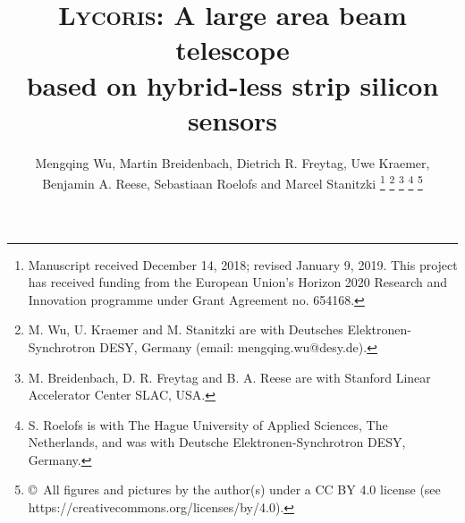 \documentclass[journal]{IEEEtran}
\begin{document}

\title{\textsc{Lycoris}: A large area beam telescope\\ based on hybrid-less strip silicon sensors}

%
%
%


\author{Mengqing Wu, Martin Breidenbach, Dietrich R. Freytag, Uwe Kraemer,\\Benjamin A. Reese, Sebastiaan Roelofs and Marcel Stanitzki%
\thanks{Manuscript received December 14, 2018; revised January 9, 2019. This project has received funding from the European Union's Horizon 2020 Research and Innovation programme under Grant Agreement no. 654168.}
\thanks{M. Wu, U. Kraemer and M. Stanitzki are with Deutsches Elektronen-Synchrotron DESY, Germany (email: mengqing.wu@desy.de).}%
\thanks{M. Breidenbach, D. R. Freytag and B. A. Reese are with Stanford Linear Accelerator Center SLAC, USA.}%
\thanks{S. Roelofs is with The Hague University of Applied Sciences, The Netherlands, and was with Deutsche Elektronen-Synchrotron DESY, Germany.}%
\thanks{\copyright~All figures and pictures by the author(s) under a CC BY 4.0 license (see https://creativecommons.org/licenses/by/4.0).}
}
\end{document}
